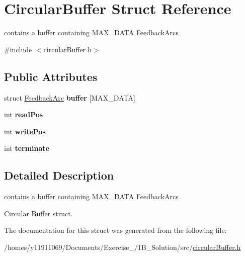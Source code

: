 \hypertarget{structCircularBuffer}{\section{Circular\-Buffer Struct Reference}
\label{structCircularBuffer}
}


contains a buffer containing M\-A\-X\-\_\-\-D\-A\-T\-A Feedback\-Arcs  




{\ttfamily \#include $<$circular\-Buffer.\-h$>$}

\subsection*{Public Attributes}
\begin{DoxyCompactItemize}
\item 
\hypertarget{structCircularBuffer_a5e0b80f2c33c72f8d574cac0e0c26616}{struct \hyperlink{structFeedbackArc}{Feedback\-Arc} {\bfseries buffer} \mbox{[}M\-A\-X\-\_\-\-D\-A\-T\-A\mbox{]}}\label{structCircularBuffer_a5e0b80f2c33c72f8d574cac0e0c26616}

\item 
\hypertarget{structCircularBuffer_a6ebca02055642c95bee6b1629c76cbaa}{int {\bfseries read\-Pos}}\label{structCircularBuffer_a6ebca02055642c95bee6b1629c76cbaa}

\item 
\hypertarget{structCircularBuffer_a1e06cb7d831b6eabfe3e3104359dae20}{int {\bfseries write\-Pos}}\label{structCircularBuffer_a1e06cb7d831b6eabfe3e3104359dae20}

\item 
\hypertarget{structCircularBuffer_ac833d830605283686dd71d48cbd78fab}{int {\bfseries terminate}}\label{structCircularBuffer_ac833d830605283686dd71d48cbd78fab}

\end{DoxyCompactItemize}


\subsection{Detailed Description}
contains a buffer containing M\-A\-X\-\_\-\-D\-A\-T\-A Feedback\-Arcs 

Circular Buffer struct. 

The documentation for this struct was generated from the following file\-:\begin{DoxyCompactItemize}
\item 
/homes/y11911069/\-Documents/\-Exercise\-\_/1\-B\-\_\-\-Solution/src/\hyperlink{circularBuffer_8h}{circular\-Buffer.\-h}\end{DoxyCompactItemize}
